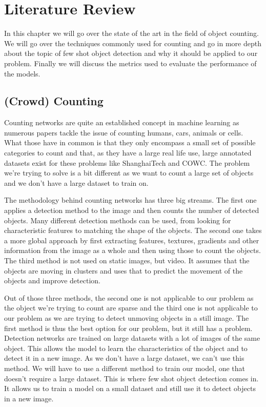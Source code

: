 
\chapter{Literature Review}
In this chapter we will go over the state of the art in the field of object counting. We will go over the techniques commonly used for counting and go in more depth about the topic of few shot object detection and why it should be applied to our problem. Finally we will discuss the metrics used to evaluate the performance of the models.

\section{(Crowd) Counting}
Counting networks are quite an established concept in machine learning as numerous papers tackle the issue of counting humans, cars, animals or cells. What those have in common is that they only encompass a small set of possible categories to count and that, as they have a large real life use, large annotated datasets exist for these problems like ShanghaiTech and COWC. The problem we're trying to solve is a bit different as we want to count a large set of objects and we don't have a large dataset to train on.

The methodology behind counting networks has three big streams. The first one applies a detection method to the image and then counts the number of detected objects. Many different detection methods can be used, from looking for characteristic features to matching the shape of the objects. The second one takes a more global approach by first extracting features, textures, gradients and other information from the image as a whole and then using those to count the objects. The third method is not used on static images, but video. It assumes that the objects are moving in clusters and uses that to predict the movement of the objects and improve detection.

Out of those three methods, the second one is not applicable to our problem as the object we're trying to count are sparse and the third one is not applicable to our problem as we are trying to detect unmoving objects in a still image. The first method is thus the best option for our problem, but it still has a problem. Detection networks are trained on large datasets with a lot of images of the same object. This allows the model to learn the characteristics of the object and to detect it in a new image. As we don't have a large dataset, we can't use this method. We will have to use a different method to train our model, one that doesn't require a large dataset. This is where few shot object detection comes in. It allows us to train a model on a small dataset and still use it to detect objects in a new image.


